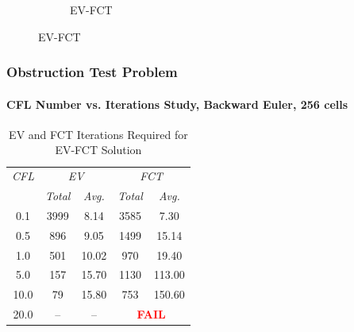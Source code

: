 \begin{frame}
\begin{figure}[h]
\begin{subfigure}{0.49\textwidth}
      \caption{EV-FCT}
   \end{subfigure}
\end{figure}

\end{frame}
\begin{frame}
\frametitle{Obstruction Test Problem}
\framesubtitle{CFL Number vs. Iterations Study, Backward Euler, 256 cells}

\begin{center}
\begin{table}[h]
\caption{EV and FCT Iterations Required for EV-FCT Solution}
\begin{tabular}{c c c c c}\toprule
\emph{CFL} & \multicolumn{2}{c}{\emph{EV}} & \multicolumn{2}{c}{\emph{FCT}}\\
           & \emph{Total} & \emph{Avg.}    &  \emph{Total} & \emph{Avg.}\\\midrule
0.1  & 3999 &  8.14 & 3585 &   7.30\\
0.5  &  896 &  9.05 & 1499 &  15.14\\
1.0  &  501 & 10.02 &  970 &  19.40\\
5.0  &  157 & 15.70 & 1130 & 113.00\\
10.0 &   79 & 15.80 &  753 & 150.60\\
20.0 &   -- &    -- & \multicolumn{2}{c}{\textcolor{red}{\textbf{FAIL}}}\\
\bottomrule\end{tabular}
\end{table}
\end{center}

\end{frame}
